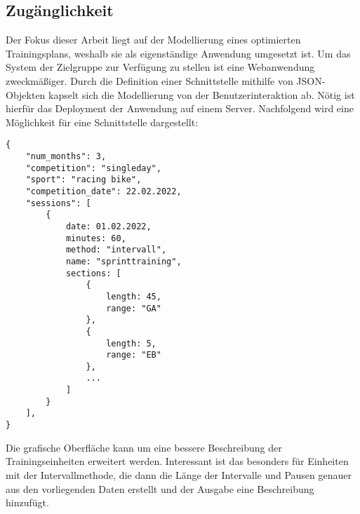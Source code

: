\subsection{Zugänglichkeit}
Der Fokus dieser Arbeit liegt auf der Modellierung eines optimierten Trainingsplans, weshalb sie als eigenständige Anwendung umgesetzt ist. Um das System der Zielgruppe zur Verfügung zu stellen ist eine Webanwendung zweckmäßiger. 
Durch die Definition einer Schnittstelle mithilfe von JSON-Objekten kapselt sich die Modellierung von der Benutzerinteraktion ab. Nötig ist hierfür das Deployment der Anwendung auf einem Server. Nachfolgend wird eine Möglichkeit für eine Schnittstelle dargestellt:
\begin{minipage}{\linewidth}
\begin{lstlisting}
{ 
    "num_months": 3,
    "competition": "singleday",
    "sport": "racing bike",
    "competition_date": 22.02.2022,
    "sessions": [
        {
            date: 01.02.2022,
            minutes: 60,
            method: "intervall",
            name: "sprinttraining", 
            sections: [
                {
                    length: 45,
                    range: "GA"
                },
                {
                    length: 5,
                    range: "EB"
                },
                ...
            ]
        }
    ], 
}
\end{lstlisting}
\end{minipage}

Die grafische Oberfläche kann um eine bessere Beschreibung der Trainingseinheiten erweitert werden. Interessant ist das besonders für Einheiten mit der Intervallmethode, die dann die Länge der Intervalle und Pausen genauer aus den vorliegenden Daten erstellt und der Ausgabe eine Beschreibung hinzufügt.


